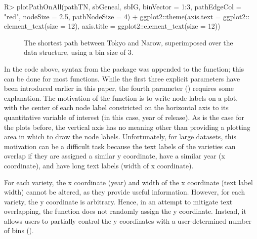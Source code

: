 \documentclass[article,shortnames]{jss}
\begin{document}
\begin{Code}
R> plotPathOnAll(pathTN, sbGeneal, sbIG, binVector = 1:3, pathEdgeCol = "red",
  nodeSize = 2.5, pathNodeSize = 4) + ggplot2::theme(axis.text = ggplot2::
  element_text(size = 12), axis.title = ggplot2::element_text(size = 12))
\end{Code}

\begin{figure}%
    \centering
    \caption{The shortest path between Tokyo and Narow, superimposed over the data structure, using a bin size of 3.}
    \label{fig:plotTNBin3}
\end{figure}

In the code above, syntax from the  package was appended to the  function; this can be done for most  functions. While the first three explicit parameters have been introduced earlier in this paper, the fourth parameter () requires some explanation. The motivation of the  function is to write node labels on a plot, with the center of each node label constricted on the horizontal axis to its quantitative variable of interest (in this case, year of release). As is the case for the plots before, the vertical axis has no meaning other than providing a plotting area in which to draw the node labels. Unfortunately, for large datasets, this motivation can be a difficult task because the text labels of the varieties can overlap if they are assigned a similar y coordinate, have a similar year (x coordinate), and have long text labels (width of x coordinate).

For each variety, the x coordinate (year) and width of the x coordinate (text label width) cannot be altered, as they provide useful information. However, for each variety, the y coordinate is arbitrary. Hence, in an attempt to mitigate text overlapping, the  function does not randomly assign the y coordinate. Instead, it allows users to partially control the y coordinates with a user-determined number of bins ().
\end{document}
